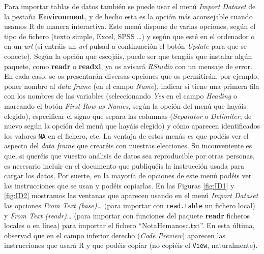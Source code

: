\documentclass[]{book}
\theoremstyle{definition}
\theoremstyle{definition}
\theoremstyle{definition}
\theoremstyle{remark}
\begin{document}
Para importar tablas de datos también se puede usar el menú \emph{Import Dataset} de la pestaña \textbf{Environment}, y de hecho esta es la opción más aconsejable cuando usamos R de manera interactiva. Este menú dispone de varias opciones, según el tipo de fichero (texto simple, Excel, SPSS \ldots{}) y según que esté en el ordenador o en un \emph{url} (si entráis un \emph{url} pulsad a continuación el botón \emph{Update} para que se conecte). Según la opción que escojáis, puede ser que tengáis que instalar algún paquete, como \textbf{readr} o \textbf{readxl}, ya os avisará \emph{RStudio} con un mensaje de error. En cada caso, se os presentarán diversas opciones que os permitirán, por ejemplo, poner nombre al \emph{data frame} (en el campo \emph{Name}), indicar si tiene una primera fila con los nombres de las variables (seleccionando \emph{Yes} en el campo \emph{Heading} o marcando el botón \emph{First Row as Names}, según la opción del menú que hayáis elegido), especificar el signo que separa las columnas (\emph{Separator} o \emph{Delimiter}, de nuevo según la opción del menú que hayáis elegido) y cómo aparecen identificados los valores \texttt{NA} en el fichero, etc. La ventaja de estos menús es que podéis ver el aspecto del \emph{data frame} que crearéis con nuestras elecciones. Su inconveniente es que, si queréis que vuestro análisis de datos sea reproducible por otras personas, es necesario incluir en el documento que publiquéis la instrucción usada para cargar los datos. Por suerte, en la mayoría de opciones de este menú podéis ver las instrucciones que se usan y podéis copiarlas. En las Figuras \ref{fig:ID1} y \ref{fig:ID2} mostramos las ventanas que aparecen usando en el menú \emph{Import Dataset} las opciones \emph{From Text (base)\ldots{}} (para importar con \texttt{read.table} un fichero local) y \emph{From Text (readr)\ldots{}} (para importar con funciones del paquete \textbf{readr} ficheros locales o en línea) para importar el fichero ``NotaHemanosc.txt''. En esta última, observad que en el campo inferior derecho (\emph{Code Preview}) aparecen las instrucciones que usará R y que podéis copiar (no copiéis el \texttt{View}, naturalmente).
\end{document}
